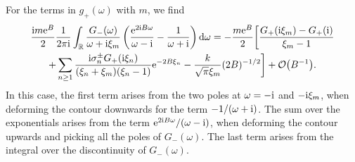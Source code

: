 \documentclass[a4paper,11pt]{article}
\theoremstyle{definition}
\newcommand{\re}{{\rm e}}
\newcommand{\ri}{{\rm i}}
\newcommand{\rd}{{\rm d}}
\begin{document}
For the terms in $g_+(\omega)$ with $m$, we find
\begin{multline}
\frac{\ri m\re^B}{2} \frac{1}{2\pi\ri} \int_\mathbb{R} \frac{G_-(\omega)}{\omega + \ri\xi_m} \left( \frac{\re^{2\ri B\omega}}{\omega-\ri} - \frac{1}{\omega+\ri} \right) \rd \omega = -\frac{m\re^B}{2}\biggl[ \frac{G_+(\ri\xi_m)-G_+(\ri)}{\xi_m-1}\\
+ \sum_{n\ge 1} \frac{\ri\sigma^\pm_n G_+(\ri\xi_n)}{(\xi_n + \xi_m)(\xi_n -1)}\re^{-2B\xi_n} - \frac{k}{\sqrt{\pi} \xi_m}(2B)^{-1/2} \biggr] + \mathcal{O}\big( B^{-1} \big).
\label{eq_m_part_2}
\end{multline}
In this case, the first term arises from the two poles at $\omega = -\ri$ and $-\ri\xi_m$, when deforming the contour downwards for the term $-1/(\omega+\ri)$. The sum over the exponentials arises from the term $\re^{2\ri B\omega}/(\omega-\ri)$, when deforming the contour upwards and picking all the poles of $G_-(\omega)$. The last term arises from the integral over the discontinuity of $G_-(\omega)$.
\end{document}
